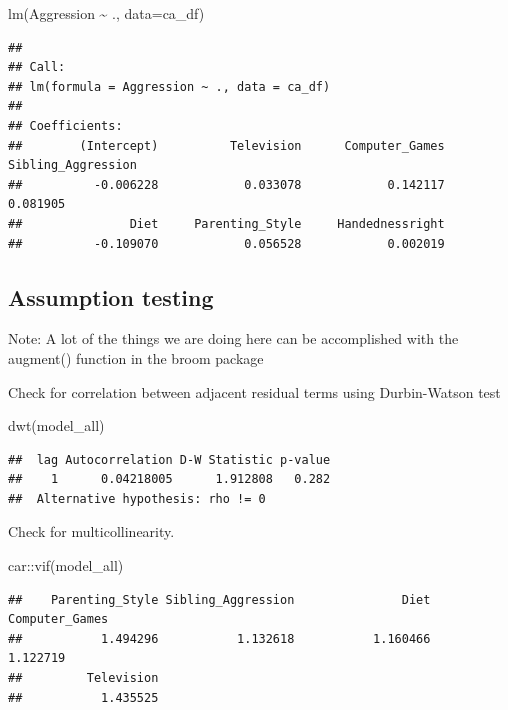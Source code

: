 \documentclass[
]{book}
\newenvironment{Shaded}{\begin{snugshade}}{\end{snugshade}}
\newcommand{\AttributeTok}[1]{\textcolor[rgb]{0.77,0.63,0.00}{#1}}
\newcommand{\FunctionTok}[1]{\textcolor[rgb]{0.00,0.00,0.00}{#1}}
\newcommand{\NormalTok}[1]{#1}
\newcommand{\SpecialCharTok}[1]{\textcolor[rgb]{0.00,0.00,0.00}{#1}}
\begin{document}
\begin{Shaded}
\begin{Highlighting}[]
\FunctionTok{lm}\NormalTok{(Aggression }\SpecialCharTok{\textasciitilde{}}\NormalTok{ ., }\AttributeTok{data=}\NormalTok{ca\_df)}
\end{Highlighting}
\end{Shaded}

\begin{verbatim}
## 
## Call:
## lm(formula = Aggression ~ ., data = ca_df)
## 
## Coefficients:
##        (Intercept)          Television      Computer_Games  Sibling_Aggression  
##          -0.006228            0.033078            0.142117            0.081905  
##               Diet     Parenting_Style     Handednessright  
##          -0.109070            0.056528            0.002019
\end{verbatim}

\hypertarget{assumption-testing}{%
\subsection{Assumption testing}\label{assumption-testing}}

Note: A lot of the things we are doing here can be accomplished with the augment() function in the broom package

Check for correlation between adjacent residual terms using Durbin-Watson test

\begin{Shaded}
\begin{Highlighting}[]
\FunctionTok{dwt}\NormalTok{(model\_all)}
\end{Highlighting}
\end{Shaded}

\begin{verbatim}
##  lag Autocorrelation D-W Statistic p-value
##    1      0.04218005      1.912808   0.282
##  Alternative hypothesis: rho != 0
\end{verbatim}

Check for multicollinearity.

\begin{Shaded}
\begin{Highlighting}[]
\NormalTok{car}\SpecialCharTok{::}\FunctionTok{vif}\NormalTok{(model\_all)}
\end{Highlighting}
\end{Shaded}

\begin{verbatim}
##    Parenting_Style Sibling_Aggression               Diet     Computer_Games 
##           1.494296           1.132618           1.160466           1.122719 
##         Television 
##           1.435525
\end{verbatim}
\end{document}
